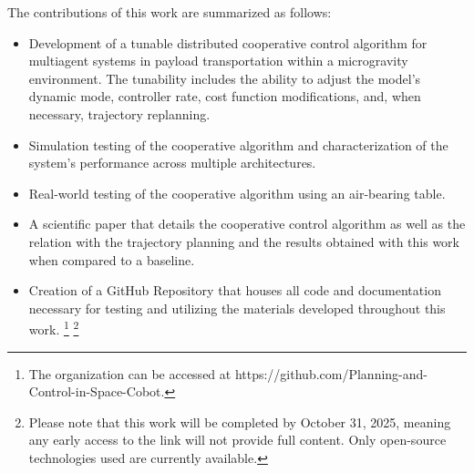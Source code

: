 The contributions of this work are summarized as follows:

\begin{itemize}
    \item Development of a tunable distributed cooperative control algorithm for multiagent systems in payload transportation within a microgravity environment. The tunability includes the ability to adjust the model’s dynamic mode, controller rate, cost function modifications, and, when necessary, trajectory replanning.
    \item Simulation testing of the cooperative algorithm and characterization of the system’s performance across multiple architectures.
    \item Real-world testing of the cooperative algorithm using an air-bearing table.
    \item A scientific paper that details the cooperative control algorithm as well as the relation with the trajectory planning and the results obtained with this work when compared to a baseline.
    \item Creation of a GitHub Repository that houses all code and documentation necessary for testing and utilizing the materials developed throughout this work. \footnote{The organization can be accessed at https://github.com/Planning-and-Control-in-Space-Cobot.} \footnote{Please note that this work will be completed by October 31, 2025, meaning any early access to the link will not provide full content. Only open-source technologies used are currently available.}
\end{itemize}